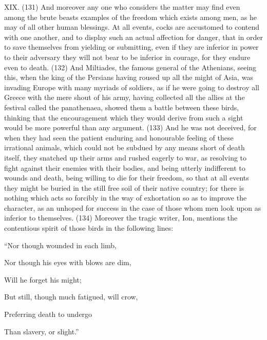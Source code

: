 XIX. (131) And moreover any one who considers the matter may find even among the brute beasts
examples of the freedom which exists among men, as he may of all other human blessings. At all
events, cocks are accustomed to contend with one another, and to display such an actual affection
for danger, that in order to save themselves from yielding or submitting, even if they are inferior in
power to their adversary they will not bear to be inferior in courage, for they endure even to death.
(132) And Miltiades, the famous general of the Athenians, seeing this, when the king of the
Persians having roused up all the might of Asia, was invading Europe with many myriads of
soldiers, as if he were going to destroy all Greece with the mere shout of his army, having
collected all the allies at the festival called the panathenaea, showed them a battle between these
birds, thinking that the encouragement which they would derive from such a sight would be more
powerful than any argument. (133) And he was not deceived, for when they had seen the patient
enduring and honourable feeling of these irrational animals, which could not be subdued by any
means short of death itself, they snatched up their arms and rushed eagerly to war, as resolving to
fight against their enemies with their bodies, and being utterly indifferent to wounds and death,
being willing to die for their freedom, so that at all events they might be buried in the still free soil of
their native country; for there is nothing which acts so forcibly in the way of exhortation so as to
improve the character, as an unhoped for success in the case of those whom men look upon as
inferior to themselves. (134) Moreover the tragic writer, Ion, mentions the contentious spirit of
those birds in the following lines:

``Nor though wounded in each limb,

Nor though his eyes with blows are dim,

Will he forget his might;

But still, though much fatigued, will crow,

Preferring death to undergo

Than slavery, or slight.''

